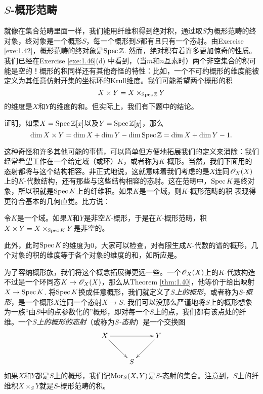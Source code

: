 \subsection{\texorpdfstring{$S$}{S}\hyp 概形范畴}\label{s:1.3.2}

就像在集合范畴里面一样，我们能用纤维积得到绝对积，通过取$S$为概形范畴的终对象，终对象是一个概形$S$，每一个概形到$S$都有且只有一个态射。由Exercise \ref{exe:1.42}，概形范畴的终对象是$\operatorname{Spec} \mathbb{Z}$. 然而，绝对积有着许多更加惊奇的性质。我们已经在Exercise \ref{exe:1.46}(d) 中看到，（当$m$和$n$互素时）两个非空集合的积可能是空的！概形的积同样还有其他奇怪的特性：比如，一个不可约概形的维度能被定义为其任意仿射开集的坐标环的Krull维度。我们可能希望两个概形的积
\[
	X\times Y=X\times_{\operatorname{Spec} \mathbb{Z}} Y
\]
的维度是$X$和$Y$的维度的和。但实际上，我们有下题中的结论。

\begin{exe}\label{exe:1.48}
证明，如果$X=\operatorname{Spec} \mathbb{Z}[x]$以及$Y=\operatorname{Spec} \mathbb{Z}[y]$，那么
\[
	\dim X\times Y=\dim X+\dim Y-\dim \operatorname{Spec} \mathbb{Z}=\dim X+\dim Y-1.
\]
\end{exe}

这种奇怪和许多其他可能的事情，可以简单但方便地拓展我们的定义来消除：我们经常希望工作在一个给定域（或环）$K$，或者称为$K$-概形。当然，我们下面用的态射都将与这个结构相容。非正式地说，这就意味着我们考虑的是$X$连同$\mathscr{O}_X(X)$上的$K$-代数结构，还有那些与这些结构相容的态射。这在范畴中，$\operatorname{Spec} K$是终对象，所以积就是$\operatorname{Spec} K$上的纤维积。如果$K$是一个域，则$K$-概形范畴的积
表现得更符合基本的几何直觉。比方说：

\begin{exe}\label{exe:1.49}
令$K$是一个域。如果$X$和$Y$是非空$K$\hyp 概形，于是在$K$\hyp 概形范畴，积$X\times Y=X\times_{\operatorname{Spec} K}Y$是非空的。
\end{exe}

此外，此时$\operatorname{Spec} K$的维度为$0$，大家可以检查，对有限生成$K$-代数的谱的概形，几个对象的积的维度等于各个对象的维度的和，如所应是。

为了容纳概形族，我们将这个概念拓展得更远一些。一个$\mathscr{O}_X(X)$上的$K$-代数构造不过是一个环同态$K\to \mathscr{O}_X(X)$，那么从Theorem \ref{thm:1.40}，他等价于给出映射$X\to \operatorname{Spec} K$. 将$\operatorname{Spec} K$换成任意概形，我们就定义了$S$\textit{上的概形}，或者称为$S$-\textit{概形}，是一个概形$X$连同一个态射$X\to S$. 我们可以没那么严谨地将$S$上的概形想象为一族“由$S$中的点参数化的”概形，即对每一个$S$上的点，我们都有该点处的纤维。一个\textit{$S$上的概形的态射}（或称为\textit{$S$-态射}）是一个交换图
\[
	\xymatrix{
	X\ar[rr]\ar[rd]&&Y\ar[ld]\\
	&S&
	}
\]
如果$X$和$Y$都是$S$上的概形，我们记$\operatorname{Mor}_S(X,Y)$是$S$-态射的集合。注意到，$S$上的纤维积$X\times_S Y$就是$S$-概形范畴的积。

